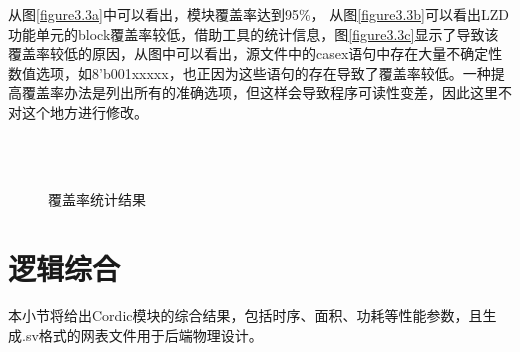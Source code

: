 \documentclass[a4paper,12pt]{report}
\begin{document}
从图\ref{figure3.3a}中可以看出，模块覆盖率达到95\%， 从图\ref{figure3.3b}可以看出LZD功能单元的block覆盖率较低，借助工具的统计信息，图\ref{figure3.3c}显示了导致该覆盖率较低的原因，从图中可以看出，源文件中的casex语句中存在大量不确定性数值选项，如8'b001xxxxx，也正因为这些语句的存在导致了覆盖率较低。一种提高覆盖率办法是列出所有的准确选项，但这样会导致程序可读性变差，因此这里不对这个地方进行修改。
\begin{figure}[!hbtp]
\centering
{}\\
\\
\caption{覆盖率统计结果}
\label{figure3.3}
\end{figure}
\section{逻辑综合}
本小节将给出Cordic模块的综合结果，包括时序、面积、功耗等性能参数，且生成.sv格式的网表文件用于后端物理设计。
\end{document}
